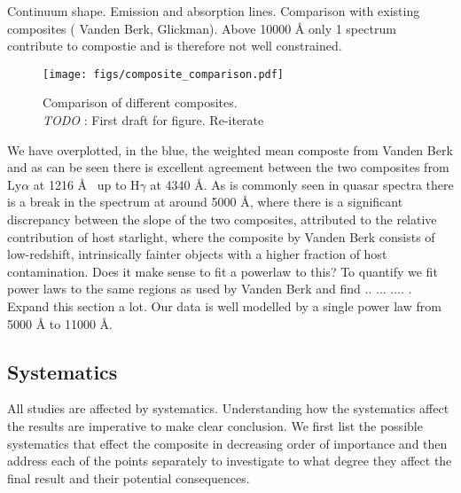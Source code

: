 \documentclass{aa}    %
\newcommand{\figlabel}[1]{\label{fig:#1}}
\newcommand{\sectlabel}[1]{\label{sect:#1}}
\newcommand{\todo}[3]{{\color{#2}\emph{#1}: #3}}
\newcommand{\jstodo}[1]{\todo{ \\TODO }{green}{#1}}
\begin{document}
Continuum shape. Emission and absorption lines. Comparison with existing composites ( Vanden Berk, Glickman). Above 10000 \r{A} only 1 spectrum contribute to compostie and is therefore not well constrained. 
 \begin{figure*}[hbtp]
   \centering
   \texttt{[image: figs/composite\_comparison.pdf]}
   \caption[]{Comparison of different composites. \jstodo{First draft for figure. Re-iterate}}
  \figlabel{composite_comparison}
 \end{figure*}

 We have overplotted, in the blue, the weighted mean composte from Vanden Berk and as can be seen there is excellent agreement between the two composites from Ly$\alpha$ at 1216 \AA~ up to H$\gamma$ at 4340 \AA. As is commonly seen in quasar spectra there is a break in the spectrum at around 5000 \r{A}, where there is a significant discrepancy between the slope of the two composites, attributed to the relative contribution of host starlight, where the composite by Vanden Berk consists of low-redshift, intrinsically fainter objects with a higher fraction of host contamination. Does it make sense to fit a powerlaw to this? To quantify we fit power laws to the same regions as used by Vanden Berk and find .. ... .... . Expand this section a lot. Our data is well modelled by a single power law from 5000 \r{A} to 11000 \r{A}. 
 












\subsection{Systematics}  \sectlabel{systematics}

All studies are affected by systematics. Understanding how the systematics affect the results are imperative to make clear conclusion. We first list the possible systematics that effect the composite in decreasing order of importance and then address each of the points separately to investigate to what degree they affect the final result and their potential consequences.
\end{document}
